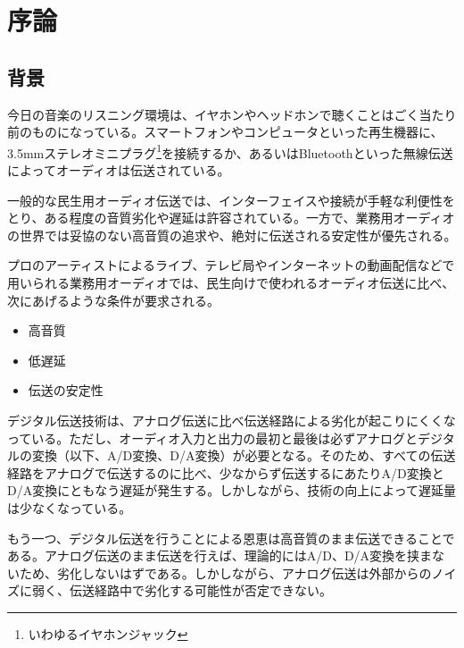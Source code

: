\chapter{序論}
\label{chap:introduction}

\section{背景}
\label{section:background}

今日の音楽のリスニング環境は、イヤホンやヘッドホンで聴くことはごく当たり前のものになっている。スマートフォンやコンピュータといった再生機器に、3.5mmステレオミニプラグ\footnote{いわゆるイヤホンジャック}を接続するか、あるいはBluetoothといった無線伝送によってオーディオは伝送されている。

一般的な民生用オーディオ伝送では、インターフェイスや接続が手軽な利便性をとり、ある程度の音質劣化や遅延は許容されている。一方で、業務用オーディオの世界では妥協のない高音質の追求や、絶対に伝送される安定性が優先される。

プロのアーティストによるライブ、テレビ局やインターネットの動画配信などで用いられる業務用オーディオでは、民生向けで使われるオーディオ伝送に比べ、次にあげるような条件が要求される。

\begin{itemize}
  \item 高音質
  \item 低遅延
  \item 伝送の安定性
\end{itemize}

デジタル伝送技術は、アナログ伝送に比べ伝送経路による劣化が起こりにくくなっている。ただし、オーディオ入力と出力の最初と最後は必ずアナログとデジタルの変換（以下、A/D変換、D/A変換）が必要となる。そのため、すべての伝送経路をアナログで伝送するのに比べ、少なからず伝送するにあたりA/D変換とD/A変換にともなう遅延が発生する。しかしながら、技術の向上によって遅延量は少なくなっている。


もう一つ、デジタル伝送を行うことによる恩恵は高音質のまま伝送できることである。アナログ伝送のまま伝送を行えば、理論的にはA/D、D/A変換を挟まないため、劣化しないはずである。しかしながら、アナログ伝送は外部からのノイズに弱く、伝送経路中で劣化する可能性が否定できない。

